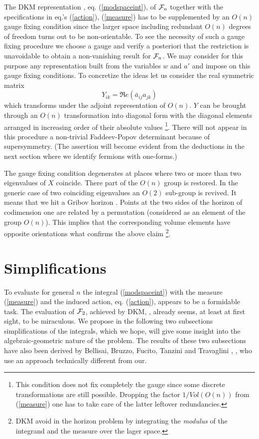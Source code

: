 \documentclass[a4paper,12pt]{article}
\begin{document}
The DKM representation , eq. (\ref{modspaceint}), of ${\cal F}_n$ 
together with the specifications in eq.'s (\ref{action}), 
(\ref{measure}) has to be supplemented by an $O(n)$ gauge fixing  
condition since the larger 
space including redundant $O(n)$ degrees of freedom turns out to 
be non-orientable. To see the necessity of such a gauge fixing 
procedure we choose a gauge and verify a posteriori that the 
restriction is unavoidable to obtain a non-vanishing result 
for ${\cal F}_n$. We may consider for this purpose any representation 
built from the variables $w$ and $a'$ and impose on this gauge 
fixing conditions. To concretize the ideas let us consider the real 
symmetric matrix 
\[
Y_{ik}=\Re e \left(\bar{a}_{ij}a_{jk}\right)
\]
which transforms under the adjoint representation of $O(n)$. $Y$ 
can be brought through an $O(n)$ transformation into diagonal 
form with the diagonal elements arranged in increasing order of 
their absolute values \footnote{
This condition does not fix completely the gauge since some 
discrete transformations are still possible. Dropping
the factor $1/Vol(O(n))$ from (\ref{measure}) one has to take 
care of the latter leftover redundancies.}. There will not appear 
in this procedure a 
non-trivial Faddeev-Popov determinant because of supersymmetry. 
(The assertion will become evident from the deductions in the 
next section where we identify fermions with one-forms.)

The gauge fixing condition degenerates at places where two or more 
than two eigenvalues of $X$ coincide. There part of the $O(n)$ 
group is restored. In the generic case of two coinciding eigenvalues 
an $O(2)$ sub-group is revived. It means that we hit a Gribov 
horizon \cite{gribov}. Points at the two sides of the horizon 
of codimension one are 
related by a permutation (considered as an element of the group 
$O(n)$). This implies that the corresponding volume elements have 
opposite orientations what confirms the above claim 
\footnote{DKM avoid in \cite{dorey1} 
the horizon problem  by integrating the {\it modulus} of the integrand 
and the measure over the lager space.}. 

\section{Simplifications}\label{sec:III} 

To evaluate for general $n$ the integral (\ref{modspaceint}) with 
the measure (\ref{measure}) and the induced action, eq. 
(\ref{action}), appears to be a formidable task. The evaluation 
of ${\cal F}_2$, achieved by DKM, \cite{dorey1}, already seems, at 
least at first 
sight, to be miraculous. We propose in the following two 
subsections simplifications of the integrals, which we hope, will 
give some insight into the algebraic-geometric nature of the 
problem. The results of these two subsections have also 
been derived by Bellisai, Bruzzo, Fucito, Tanzini and Travaglini 
\cite{tanzini1}, \cite{tanzini2}, who use an  approach technically 
different from our.  
\end{document}
